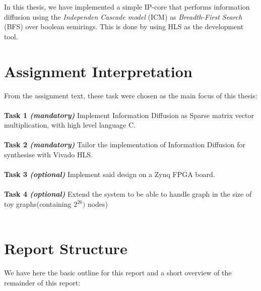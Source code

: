 In this thesis, we have implemented a simple IP-core that performs information diffusion using the \textit{Independen Cascade model} (ICM) as \textit{Breadth-First Search} (BFS) over boolean semirings. This is done by using HLS as the development tool. 


\section{Assignment Interpretation}
From the assignment text, these task were chosen as the main focus of this thesis:\\ \hfil \\ \hfil
\textbf{Task 1 \textit{(mandatory)}} Implement Information Diffusion as Sparse matrix vector multiplication, with high level language C.  \\ \hfil \\ \hfil
\textbf{Task 2 \textit{(mandatory)}} Tailor the implementation of Information Diffusion for synthesise with Vivado HLS.   \\ \hfil \\ \hfil
\textbf{Task 3 \textit{(optional)}} Implement said design on a  Zynq FPGA board. \\ \hfil \\ \hfil
\textbf{Task 4 \textit{(optional)}} Extend the system to be able to handle graph in the size of toy graphs(containing $2^{26})$ nodes) \\ \hfil \\ \hfil


\section{Report Structure}
We have here the basic outline for this report and a short overview of the remainder of this report:\\ \hfill

